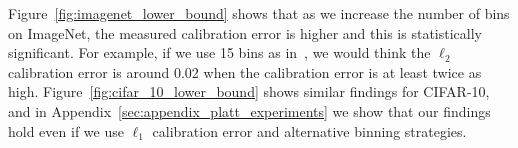 Figure~\ref{fig:imagenet_lower_bound} shows that as we increase the number of bins on ImageNet, the measured calibration error is higher and this is statistically significant. For example, if we use 15 bins as in~\cite{guo2017calibration}, we would think the $\ell_2$ calibration error is around 0.02 when the calibration error is at least twice as high. Figure~\ref{fig:cifar_10_lower_bound} shows similar findings for CIFAR-10, and in Appendix~\ref{sec:appendix_platt_experiments} we show that our findings hold even if we use $\ell_1$ calibration error and alternative binning strategies.


